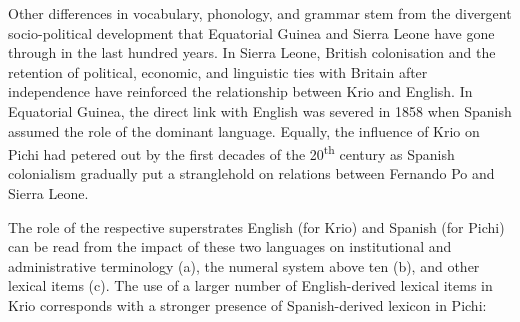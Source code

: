 Other differences in vocabulary, phonology, and grammar stem from the divergent socio-political development that Equatorial Guinea and Sierra Leone have gone through in the last hundred years. In Sierra Leone, British colonisation and the retention of political, economic, and linguistic ties with Britain after independence have reinforced the relationship between Krio and English. In Equatorial Guinea, the direct link with English was severed in 1858 when Spanish assumed the role of the dominant language. Equally, the influence of Krio on Pichi had petered out by the first decades of the 20\textsuperscript{th} century as Spanish colonialism gradually put a stranglehold on relations between Fernando Po and Sierra Leone. 


The role of the respective superstrates English (for Krio) and Spanish (for Pichi) can be read from the impact of these two languages on institutional and administrative terminology (a), the numeral system above ten (b), and other lexical items (c). The use of a larger number of English-derived lexical items in Krio corresponds with a stronger presence of Spanish-derived lexicon in Pichi:

